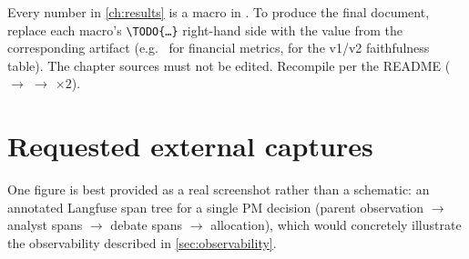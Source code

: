 Every number in \cref{ch:results} is a macro in . To produce
the final document, replace each macro's \texttt{\textbackslash TODO\{\ldots\}} right-hand side with the value from the
corresponding artifact (e.g.\  for financial metrics,
 for the v1/v2 faithfulness table). The chapter sources must not
be edited. Recompile per the README ( $\to$  $\to$ 
$\times 2$).

\section{Requested external captures}

One figure is best provided as a real screenshot rather than a schematic: an annotated
Langfuse span tree for a single PM decision (parent observation $\rightarrow$ analyst spans
$\rightarrow$ debate spans $\rightarrow$ allocation), which would concretely illustrate the
observability described in \cref{sec:observability}. 
